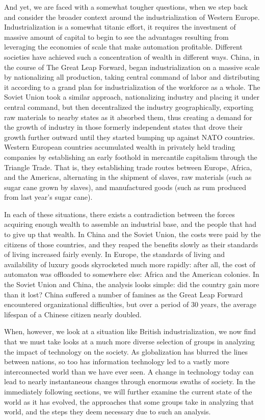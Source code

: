 And yet, we are faced with a somewhat tougher questions, when we step 
back and consider the broader context around the industrialization of 
Western Europe.  Industrialization is a somewhat titanic effort, it 
requires the investment of massive amount of capital to begin to see 
the advantages resulting from leveraging the economies of scale that 
make automation profitable.  Different societies have achieved such 
a concentration of wealth in different ways.  China, in the course of 
The Great Leap Forward, began industrialization on a massive scale by 
nationalizing all production, taking central command of labor and 
distributing it according to a grand plan for industrialization of the 
workforce as a whole.  The Soviet Union took a similar approach, 
nationalizing industry and placing it under central command, but then 
decentralized the industry geographically, exporting raw materials to 
nearby states as it absorbed them, thus creating a demand for the 
growth of industry in those formerly independent states that drove 
their growth further outward until they started bumping up against 
NATO countries.  Western European countries accumulated wealth in 
privately held trading companies by establishing an early foothold 
in mercantile capitalism through the Triangle Trade. That is, they 
establishing trade routes between Europe, Africa, and the Americas, 
alternating in the shipment of slaves, raw materials (such as sugar 
cane grown by slaves), and manufactured goods (such as rum produced 
from last year's sugar cane).  

In each of these situations, there exists a contradiction 
between the forces acquiring enough wealth to assemble an industrial 
base, and the people that had to give up that wealth.  In China and 
the Soviet Union, the costs were paid by the citizens of those 
countries, and they reaped the benefits slowly as their standards of 
living increased fairly evenly.  In Europe, the standards of living 
and availability of luxury goods skyrocketed much more rapidly: after 
all, the cost of automaton was offloaded to somewhere else: Africa and 
the American colonies.  In the Soviet Union and China, the analysis looks 
simple: did the country gain more than it lost?  China suffered a number 
of famines as the Great Leap Forward encountered organizational 
difficulties, but over a period of 30 years, the average lifespan of a 
Chinese citizen nearly doubled.  

When, however, we look at a situation like British industrialization, 
we now find that we must take looks at a much more diverse selection 
of groups in analyzing the impact of technology on the society.  As 
globalization has blurred the lines between nations, so too has 
information technology led to a vastly more interconnected world than 
we have ever seen.  A change in technology today can lead to nearly 
instantaneous changes through enormous swaths of society.  In the 
immediately following sections, we will further examine the current 
state of the world as it has evolved, the approaches that some 
groups take in analyzing that world, and the steps they deem necessary 
due to such an analysis.

